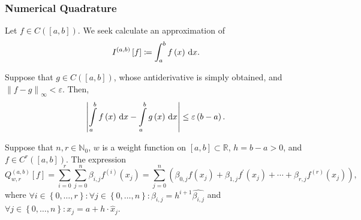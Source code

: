 \begin{frame}
    \frametitle{Numerical Quadrature}

    Let $f\in C\left(\left[a,b\right]\right)$.
    We seek calculate an approximation of
    \begin{equation*}
        I^{\left(a,b\right)}\left[f\right]\coloneqq
        \int_{a}^{b}
        f\left(x\right)
        \dl x.
    \end{equation*}

    Suppose that $g\in C\left(\left[a,b\right]\right)$,
    whose antiderivative is simply obtained, and
    \begin{math}
        {\left\|f-g\right\|}_{\infty}<\varepsilon
    \end{math}.
    Then,
    \begin{equation}
        \left|
        \int\limits_{a}^{b}
        f\left(x\right)
        \dl x-
        \int\limits_{a}^{b}
        g\left(x\right)
        \dl x
        \right|\leq
        \varepsilon\left(b-a\right).
    \end{equation}

    \begin{definition}
        Suppose that $n,r\in\mathbb{N}_{0}$,
        $w$ is a weight function on $\left[a,b\right]\subset\mathbb{R}$,
        $h=b-a>0$, and $f\in C^{r}\left(\left[a,b\right]\right)$.
        The expression
        \begin{equation*}
            Q^{\left(a,b\right)}_{w,r}\left[f\right]=
            \sum\limits_{i=0}^{r}
            \sum\limits_{j=0}^{n}
            \beta_{i,j}
            f^{\left(i\right)}\left(x_{j}\right)=
            \sum\limits_{j=0}^{n}
            \left(
            \beta_{0,j}
            f\left(x_{j}\right)+
            \beta_{1,j}
            f^{\prime}\left(x_{j}\right)+
            \cdots+
            \beta_{r,j}
            f^{\left(r\right)}\left(x_{j}\right)
            \right),
        \end{equation*}
        where
        \begin{math}
            \forall i\in\left\{0,\dotsc,r\right\}:
            \forall j\in\left\{0,\dotsc,n\right\}:
            \beta_{i,j}=
            h^{i+1}
            \widehat{\beta_{i,j}}
        \end{math}
        and
        \begin{math}
            \forall j\in\left\{0,\dotsc,n\right\}:
            x_{j}=
            a+
            h\cdot\widehat{x}_{j}
        \end{math}.
    \end{definition}



\end{frame}
